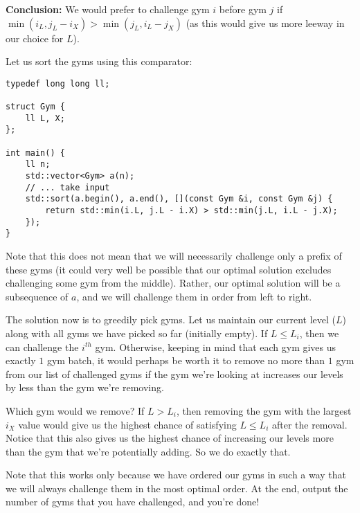\documentclass{article}
\begin{document}
\textbf{Conclusion:} We would prefer to challenge gym $i$ before gym $j$ if $\min(i_L,j_L-i_X) > \min(j_L,i_L-j_X)$ (as this would give us more leeway in our choice for $L$).

Let us sort the gyms using this comparator:
\begin{verbatim}
typedef long long ll;

struct Gym {
    ll L, X;
};

int main() {
    ll n;
    std::vector<Gym> a(n);
    // ... take input
    std::sort(a.begin(), a.end(), [](const Gym &i, const Gym &j) {
        return std::min(i.L, j.L - i.X) > std::min(j.L, i.L - j.X);
    });
}
\end{verbatim}

Note that this does not mean that we will necessarily challenge only a prefix of these gyms (it could very well be possible that our optimal solution excludes challenging some gym from the middle). Rather, our optimal solution will be a subsequence of $a$, and we will challenge them in order from left to right.

The solution now is to greedily pick gyms. Let us maintain our current level ($L$) along with all gyms we have picked so far (initially empty). If $L\le L_i$, then we can challenge the $i^{th}$ gym. Otherwise, keeping in mind that each gym gives us exactly $1$ gym batch, it would perhaps be worth it to remove no more than $1$ gym from our list of challenged gyms if the gym we're looking at increases our levels by less than the gym we're removing.

Which gym would we remove? If $L>L_i$, then removing the gym with the largest $i_X$ value would give us the highest chance of satisfying $L\le L_i$ after the removal. Notice that this also gives us the highest chance of increasing our levels more than the gym that we're potentially adding. So we do exactly that.

Note that this works only because we have ordered our gyms in such a way that we will always challenge them in the most optimal order. At the end, output the number of gyms that you have challenged, and you're done!
\end{document}

